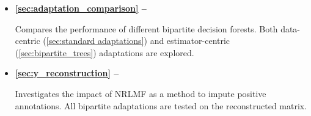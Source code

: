 



\begin{mdframed}[frametitle={Related experiments}]

   \begin{itemize}
    \item \textbf{\autoref{sec:adaptation_comparison} -- }

    Compares the performance of different bipartite decision forests. Both data-centric (\autoref{sec:standard adaptations}) and estimator-centric (\autoref{sec:bipartite_trees}) adaptations are explored.

    \item \textbf{\autoref{sec:y_reconstruction} -- }

    Investigates the impact of NRLMF as a method to impute positive annotations.
    All bipartite adaptations are tested on the reconstructed matrix.

   \end{itemize}
\end{mdframed}




